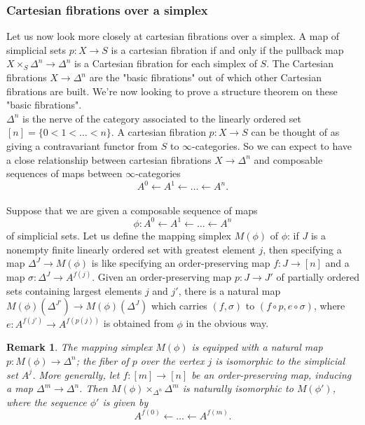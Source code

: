 \documentclass[12pt]{amsart}
\newcommand{\8}{\ensuremath{\infty}}
\newtheorem{remark}{Remark}
\begin{document}
{{\subsubsection{Cartesian fibrations over a simplex}
Let us now look more closely at cartesian fibrations over a simplex. A map of simplicial sets $p:X\rightarrow S$ is a cartesian fibration if and only if the pullback map $X\times_S \Delta^n \rightarrow \Delta^n$ is a Cartesian fibration for each simplex of $S$. The Cartesian fibrations $X\rightarrow \Delta^n$ are the "basic fibrations" out of which other Cartesian fibrations are built. We're now looking to prove a structure theorem on these "basic fibrations".\\
$\Delta^n$ is the nerve of the category associated to the linearly ordered set $[n] = \{0<1<\dots <n\}.$ A cartesian fibration $p:X\rightarrow S$ can be thought of as giving a contravariant functor from $S$ to $\8$-categories. So we can expect to have a close relationship between cartesian fibrations $X\rightarrow \Delta^n$ and composable sequences of maps between \8-categories \[A^0\leftarrow A^1\leftarrow \dots \leftarrow A^n.\]\\
Suppose that we are given a composable sequence of maps\[\phi:A^0\leftarrow A^1\leftarrow \dots \leftarrow A^n\] of simplicial sets. Let us define the mapping simplex $M(\phi)$ of $\phi$: if $J$ is a nonempty finite linearly ordered set with greatest element $j$, then specifying a map $\Delta^J\rightarrow M(\phi)$ is like specifying an order-preserving map $f:J\rightarrow [n]$ and a map $\sigma:\Delta^J\rightarrow A^{f(j)}$. Given an order-preserving map $p:J\rightarrow J'$ of partially ordered sets containing largest elements $j$ and $j'$, there is a natural map $M(\phi)(\Delta^{J'})\rightarrow M(\phi)(\Delta^J)$ which carries $(f,\sigma)$ to $(f\circ p, e\circ\sigma)$, where $e:A^{f(j')}\rightarrow A^{f(p(j))}$ is obtained from $\phi$ in the obvious way.

\begin{remark}
  The mapping simplex $M(\phi)$ is equipped with a natural map $p:M(\phi)\rightarrow \Delta^n$; the fiber of $p$ over the vertex $j$ is isomorphic to the simplicial set $A^j$. More generally, let $f:[m]\rightarrow [n]$ be an order-preserving map, inducing a map $\Delta^m\rightarrow \Delta^n$. Then $M(\phi)\times_{\Delta^n}\Delta^m$ is naturally isomorphic to $M(\phi')$, where the sequence $\phi'$ is given by \[A^{f(0)}\leftarrow\dots\leftarrow A^{f(m)}.\]
\end{remark}

}}
\end{document}
